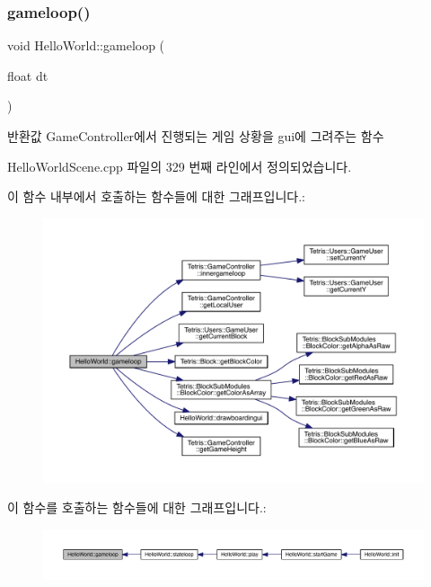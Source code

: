 \subsubsection{\texorpdfstring{gameloop()}{gameloop()}}
{\footnotesize\ttfamily void Hello\+World\+::gameloop (\begin{DoxyParamCaption}\item[{float}]{dt }\end{DoxyParamCaption})\hspace{0.3cm}{\ttfamily [protected]}}

\begin{DoxyReturn}{반환값}
Game\+Controller에서 진행되는 게임 상황을 gui에 그려주는 함수 
\end{DoxyReturn}


Hello\+World\+Scene.\+cpp 파일의 329 번째 라인에서 정의되었습니다.

이 함수 내부에서 호출하는 함수들에 대한 그래프입니다.\+:
\nopagebreak
\begin{figure}[H]
\begin{center}
\leavevmode
\includegraphics[width=350pt]{class_hello_world_af59f38fb445c1302e5d2f7e18d0ab0e5_cgraph}
\end{center}
\end{figure}
이 함수를 호출하는 함수들에 대한 그래프입니다.\+:
\nopagebreak
\begin{figure}[H]
\begin{center}
\leavevmode
\includegraphics[width=350pt]{class_hello_world_af59f38fb445c1302e5d2f7e18d0ab0e5_icgraph}
\end{center}
\end{figure}
\mbox{\label{class_hello_world_a73ad0d041144a1e610534fe5df41d556}} 
